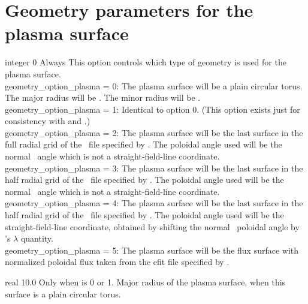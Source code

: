 \section{Geometry parameters for the plasma surface}

{integer}
{0}
{Always}
{This option controls which type of geometry is used for the plasma surface.\\

{\ttfamily geometry\_option\_plasma} = 0: The plasma surface will be a plain circular torus. The major radius will be .
     The minor radius will be .\\

{\ttfamily geometry\_option\_plasma} = 1: Identical to option 0. (This option exists just for consistency with  and .)\\

{\ttfamily geometry\_option\_plasma} = 2: The plasma surface will be the last surface in the full radial grid of the \vmec~file specified by .
The poloidal angle used will be the normal \vmec~angle which is not a straight-field-line coordinate.\\

{\ttfamily geometry\_option\_plasma} = 3: The plasma surface will be the last surface in the half radial grid of the \vmec~file specified by .
The poloidal angle used will be the normal \vmec~angle which is not a straight-field-line coordinate.\\

{\ttfamily geometry\_option\_plasma} = 4: The plasma surface will be the last surface in the half radial grid of the \vmec~file specified by .
The poloidal angle used will be the straight-field-line coordinate, obtained by shifting the normal \vmec~poloidal angle by \vmec's $\lambda$ quantity.\\

{\ttfamily geometry\_option\_plasma} = 5: The plasma surface will be the flux surface with normalized poloidal flux
 taken from the {\ttfamily efit} file specified by .
}

\myhrule

{real}
{10.0}
{Only when  is 0 or 1.}
{Major radius of the plasma surface, when this surface is a plain circular torus.}

